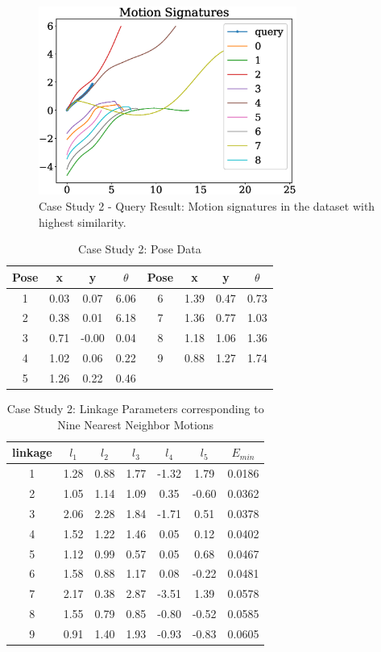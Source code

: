 \documentclass[twocolumn,10pt]{asme2e}
\begin{document}
\begin{figure}
\centering
\includegraphics[width=240pt]{figure/fig_ex_motion_signatures.eps}
  \caption{Case Study 2 - Query Result: Motion signatures in the dataset with highest similarity.}
\label{queryResult}
\end{figure}


\begin{table}
\caption{Case Study 2: Pose Data}
\centering
\label{poseData}
\begin{tabular}{cccccccc}
\hline
Pose & x & y & $\theta$ & Pose & x & y & $\theta$ \\
\hline
1 & 0.03 & 0.07 & 6.06 & 6 & 1.39 & 0.47 & 0.73 \\
2 & 0.38 & 0.01 & 6.18 & 7 & 1.36 & 0.77 & 1.03 \\
3 & 0.71 &-0.00 & 0.04 & 8 & 1.18 & 1.06 & 1.36 \\
4 & 1.02 & 0.06 & 0.22 & 9 & 0.88 & 1.27 & 1.74 \\
5 & 1.26 & 0.22 & 0.46 & \\
\end{tabular}
\end{table}

\begin{table}
\caption{Case Study 2: Linkage Parameters corresponding to Nine Nearest Neighbor Motions}
\centering
\label{ex2_knnLinkageData}
\begin{tabular}{ccccccc}
\hline
  linkage & $l_1$ & $l_2$ & $l_3$ & $l_4$ & $l_5$ & $E_{min}$ \\
\hline
 1 & 1.28 & 0.88 & 1.77 & -1.32 & 1.79 & 0.0186   \\
 2 & 1.05 & 1.14 & 1.09 & 0.35 & -0.60 & 0.0362   \\
 3 & 2.06 & 2.28 & 1.84 & -1.71 & 0.51 & 0.0378   \\
 4 & 1.52 & 1.22 & 1.46 & 0.05 & 0.12 & 0.0402    \\
 5 & 1.12 & 0.99 & 0.57 & 0.05 & 0.68 & 0.0467    \\
 6 & 1.58 & 0.88 & 1.17 & 0.08 & -0.22 & 0.0481   \\
 7 & 2.17 & 0.38 & 2.87 & -3.51 & 1.39 & 0.0578   \\
 8 & 1.55 & 0.79 & 0.85 & -0.80 & -0.52 & 0.0585  \\
 9 & 0.91 & 1.40 & 1.93 & -0.93 & -0.83 & 0.0605
\end{tabular}
\end{table}
\end{document}
